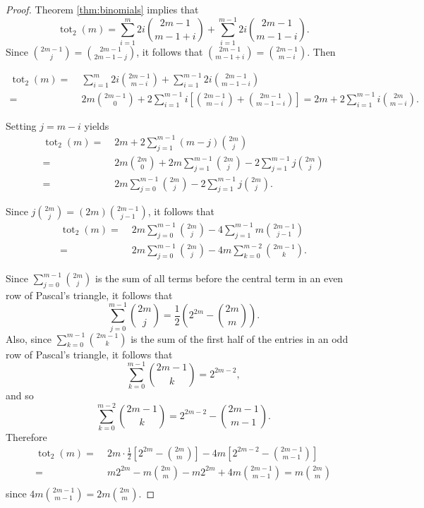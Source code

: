 \documentclass[12pt]{amsart}
\theoremstyle{definition}
\theoremstyle{remark}
\numberwithin{equation}{section}
\def\tot{\operatorname{tot}}
\begin{document}
\begin{proof}
Theorem \ref{thm:binomials} implies that
\[\tot_2(m) =  \sum_{i=1}^m 2i \binom{2m-1}{m-1+i} + \sum_{i=1}^{m-1} 2i \binom{2m-1}{m-1-i}.\]
Since $\binom{2m-1}{j} = \binom{2m-1}{2m-1-j}$, it follows that $\binom{2m-1}{m-1+i} = \binom{2m-1}{m-i}$.  Then 

\begin{align*}
\tot_{2}(m) = & \; \sum_{i=1}^m 2i \binom{2m-1}{m-i} + \sum_{i=1}^{m-1} 2i \binom{2m-1}{m-1-i} \\
= & \; 2m\binom{2m-1}{0}+2\sum_{i=1}^{m-1} i \left[\binom{2m-1}{m-i} + \binom{2m-1}{m-1-i}\right] = 2m+2\sum_{i=1}^{m-1} i \binom{2m}{m-i}.
\end{align*}

Setting $j=m-i$ yields
\begin{align*}
\tot_2(m)= & \; 2m+2\sum_{j=1}^{m-1} (m-j) \binom{2m}{j}\\
= & \; 2m\binom{2m}{0}+2m\sum_{j=1}^{m-1} \binom{2m}{j}-2\sum_{j=1}^{m-1} j \binom{2m}{j}\\
= & \; 2m\sum_{j=0}^{m-1} \binom{2m}{j}-2\sum_{j=1}^{m-1} j \binom{2m}{j}.
\end{align*}

Since $j\binom{2m}{j} = (2m)\binom{2m-1}{j-1}$, it follows that
\begin{align*}
\tot_2(m) = & \; 2m\sum_{j=0}^{m-1} \binom{2m}{j}-4\sum_{j=1}^{m-1} m \binom{2m-1}{j-1} \\
= & \; 2m\sum_{j=0}^{m-1} \binom{2m}{j}-4m\sum_{k=0}^{m-2}  \binom{2m-1}{k}.
\end{align*}

Since $\sum_{j=0}^{m-1}\binom{2m}{j}$ is the sum of all terms before the central term in an even row of Pascal's triangle, it follows that
\[\sum_{ j=0}^{m-1}\binom{2m}{j} = \frac{1}{2}\left(2^{2m}-\binom{2m}{m}\right).\]
Also, since $\sum_{k=0}^{m-1}\binom{2m-1}{k}$ is the sum of the first half of the entries in an odd row of Pascal's triangle, it follows that
\[ \sum_{k=0}^{m-1}\binom{2m-1}{k} = 2^{2m-2},\]
and so
\[ \sum_{k=0}^{m-2}\binom{2m-1}{k} = 2^{2m-2}-\binom{2m-1}{m-1}.\]
Therefore
\begin{align*}
\tot_2(m)= & \; 2m\cdot \frac{1}{2}\left[ 2^{2m}-\binom{2m}{m} \right]-4m\left[ 2^{2m-2}-\binom{2m-1}{m-1} \right]\\
= & \; m2^{2m}-m\binom{2m}{m} -m2^{2m}+4m\binom{2m-1}{m-1} = m\binom{2m}{m}\\
\end{align*}
since $4m\binom{2m-1}{m-1} = 2m\binom{2m}{m}$.
\end{proof}
\end{document}
